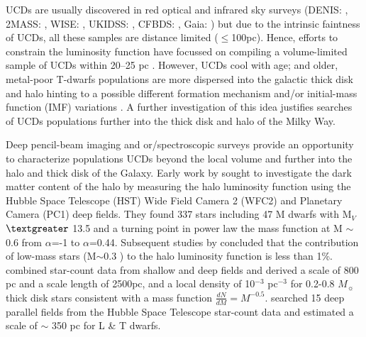 \documentclass[manuscript]{aastex}
\begin{document}
UCDs are usually discovered in red optical and infrared sky surveys (DENIS: \citealt{refId0}, 2MASS: \citealt{2007AJ....133..439C, 2010ApJS..190..100K}, WISE: \citealt{2011ApJS..197...19K, 2011ApJ...743...50C}, UKIDSS: \citealt{Marocco01062015, 2013MNRAS.430.1171D,2013MNRAS.433..457B}, CFBDS: \citealt{Reyle2010a}, Gaia: \citealt{Reyle2018}) but due to the intrinsic faintness of UCDs, all these samples are distance limited ($\leq$100pc). Hence, efforts to constrain the luminosity function have focussed on compiling a volume-limited sample of UCDs within 20--25 pc \citep{2007AJ....133..439C, 2008ApJ...676.1281M, Reyle2010a,  2019ApJS..240...19K,2019arXiv190604166B}. However, UCDs cool with age; and older, metal-poor T-dwarfs  populations are more dispersed into the galactic thick disk and halo \citep{2009ApJ...697..148B, 2019MNRAS.486.1260Z} hinting to a possible different formation mechanism and/or  initial-mass function (IMF) variations \citep{2010ARA&A..48..339B}. A further investigation of this idea justifies searches of UCDs populations further into the thick disk and halo of the Milky Way.

Deep pencil-beam  imaging and or/spectroscopic surveys provide an opportunity to characterize populations UCDs beyond the local volume and further into the halo and thick disk of the Galaxy. 
Early work by \cite{1997ApJ...482..913G} sought to investigate the dark matter content of the halo by measuring the halo luminosity function using the Hubble Space Telescope (HST) Wide Field Camera 2 (WFC2) and Planetary Camera (PC1) deep fields. They found 337 stars including 47 M dwarfs with M$_V$ $\textgreater$ 13.5 and a turning point in power law the mass function at M $\sim$0.6 \Msun from $\alpha$=-1 to $\alpha$=0.44.  Subsequent studies by \cite{1997A&A...328....5K, 1997A&A...328...83C} concluded that the contribution of low-mass stars (M$\sim$0.3 \Msun ) to the halo luminosity function is less than 1\%. \cite{2001A&A...373..886R} combined star-count data from shallow and deep fields and derived a scale of 800 pc and a scale length of 2500pc, and a local density of 10$^{-3}$ pc$^{-3}$ for 0.2-0.8 $M_\sun$ thick disk stars consistent with a mass function  $\frac{dN}{dM} =M^{-0.5}$. \cite{2005ApJ...631L.159R} searched 15 deep parallel fields from the Hubble Space Telescope star-count data and estimated a scale of $\sim$ 350 pc for L \& T dwarfs.
\end{document}
